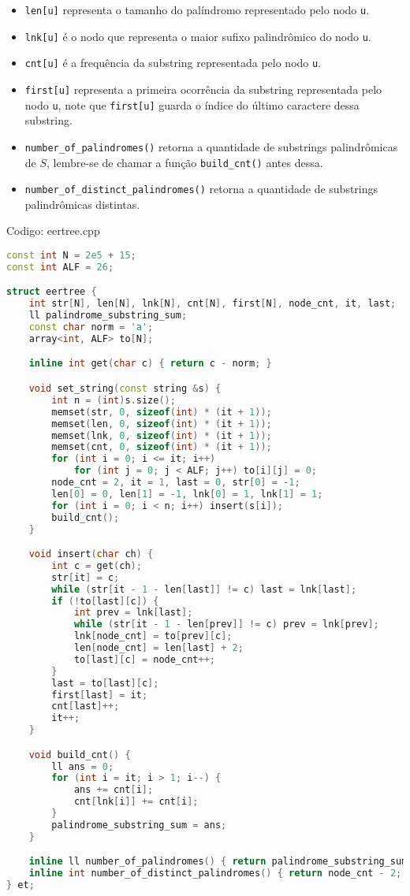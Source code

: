 \documentclass[10pt, a4paper, oneside]{book}
\begin{document}
\begin{itemize}
\item \texttt{len[u]} representa o tamanho do palíndromo representado pelo nodo \texttt{u}.
\item \texttt{lnk[u]} é o nodo que representa o maior sufixo palindrômico do nodo \texttt{u}.
\item \texttt{cnt[u]} é a frequência da substring representada pelo nodo \texttt{u}.
\item \texttt{first[u]} representa a primeira ocorrência da substring representada pelo nodo \texttt{u}, note que \texttt{first[u]} guarda o índice do último caractere dessa substring.
\item \texttt{number\_of\_palindromes()} retorna a quantidade de substrings palindrômicas de $S$, lembre-se de chamar a função \texttt{build\_cnt()} antes dessa.
\item \texttt{number\_of\_distinct\_palindromes()} retorna a quantidade de substrings palindrômicas distintas.
\end{itemize}

\hfill

Codigo: eertree.cpp

\begin{lstlisting}[language=C++]
const int N = 2e5 + 15;
const int ALF = 26;

struct eertree {
    int str[N], len[N], lnk[N], cnt[N], first[N], node_cnt, it, last;
    ll palindrome_substring_sum;
    const char norm = 'a';
    array<int, ALF> to[N];

    inline int get(char c) { return c - norm; }

    void set_string(const string &s) {
        int n = (int)s.size();
        memset(str, 0, sizeof(int) * (it + 1));
        memset(len, 0, sizeof(int) * (it + 1));
        memset(lnk, 0, sizeof(int) * (it + 1));
        memset(cnt, 0, sizeof(int) * (it + 1));
        for (int i = 0; i <= it; i++)
            for (int j = 0; j < ALF; j++) to[i][j] = 0;
        node_cnt = 2, it = 1, last = 0, str[0] = -1;
        len[0] = 0, len[1] = -1, lnk[0] = 1, lnk[1] = 1;
        for (int i = 0; i < n; i++) insert(s[i]);
        build_cnt();
    }

    void insert(char ch) {
        int c = get(ch);
        str[it] = c;
        while (str[it - 1 - len[last]] != c) last = lnk[last];
        if (!to[last][c]) {
            int prev = lnk[last];
            while (str[it - 1 - len[prev]] != c) prev = lnk[prev];
            lnk[node_cnt] = to[prev][c];
            len[node_cnt] = len[last] + 2;
            to[last][c] = node_cnt++;
        }
        last = to[last][c];
        first[last] = it;
        cnt[last]++;
        it++;
    }

    void build_cnt() {
        ll ans = 0;
        for (int i = it; i > 1; i--) {
            ans += cnt[i];
            cnt[lnk[i]] += cnt[i];
        }
        palindrome_substring_sum = ans;
    }

    inline ll number_of_palindromes() { return palindrome_substring_sum; }
    inline int number_of_distinct_palindromes() { return node_cnt - 2; }
} et;
\end{lstlisting}
\hfill
\end{document}
